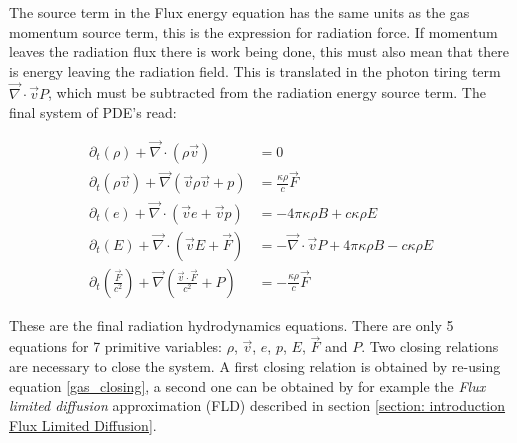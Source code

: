 The source term in the Flux energy equation has the same units as the gas momentum source term, this is the expression for radiation force. If momentum leaves the radiation flux there is work being done, this must also mean that there is energy leaving the radiation field. This is translated in the photon tiring term $\vec{\nabla} \cdot \vec{v} P$, which must be subtracted from the radiation energy source term. The final system of PDE's read:

\begin{align}
 \partial_t \left(\rho \right) + \vec{\nabla} \cdot \left( \rho \vec{v}  \right) &= 0 \label{eq: rhd_cont} \\
 \partial_t \left(\rho \vec{v} \right) + \vec{\nabla} \left( \vec{v} \rho \vec{v} + p \right) 
 &= \frac{\kappa \rho}{c} \vec{F} \label{eq: rhd_mom} \\
 \partial_t \left(e \right) + \vec{\nabla} \cdot \left( \vec{v} e + \vec{v} p \right) &= -4\pi \kappa\rho B + c \kappa \rho E \label{eq: rhd_e}\\
 \partial_t \left(E \right) +  \vec{\nabla} \cdot \left( \vec{v} E + \vec{F} \right) &=  -\vec{\nabla} \cdot \vec{v} P + 4\pi \kappa\rho B - c \kappa \rho E \label{eq: rhd_e_r} \\
 \partial_t \left(\frac{\vec{F}}{c^2} \right) +  \vec{\nabla} \left( \frac{\vec{v} \cdot \vec{F}}{c^2} + P \right) &= - \frac{\kappa \rho}{c} \vec{F} \label{eq: rhd_flux}
\end{align}

These are the final radiation hydrodynamics equations. There are only 5 equations for 7 primitive variables: $\rho$, $\vec{v}$, $e$, $p$, $E$, $\vec{F}$ and $P$. Two closing relations are necessary to close the system. A first closing relation is obtained by re-using equation \eqref{gas_closing}, a second one can be obtained by for example the \emph{Flux limited diffusion} approximation (FLD) described in section \ref{section: introduction Flux Limited Diffusion}.

